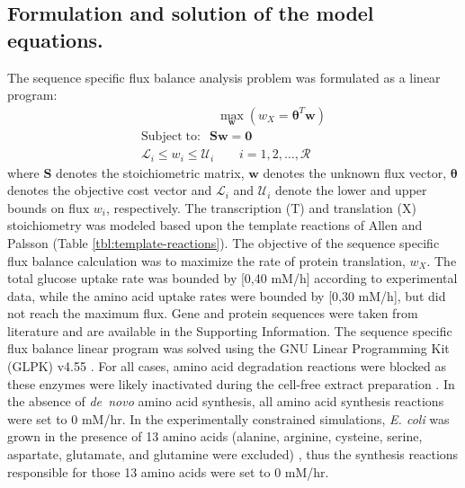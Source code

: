 \documentclass[journal=asbcd6,manuscript=article]{achemso}
\begin{document}
\subsection*{Formulation and solution of the model equations.}
The sequence specific flux balance analysis problem was formulated as a linear program:
\begin{equation}
 \begin{multlined}
	\qquad \qquad \qquad \max_{\boldsymbol{w}}{} \! \left( w_{X} = \mathbf{\boldsymbol{\theta}}^T \boldsymbol{w} \right) \\
	\mathrm{Subject \; to:}
	 \; \; \mathbf{S}\mathbf{w}=\mathbf{0} \\
\mathcal{L}_{i} \leq w_i \leq \mathcal{U}_{i}  \qquad i=1,2,\hdots,\mathcal{R}
 \end{multlined}
\end{equation}
where $\mathbf{S}$ denotes the stoichiometric matrix, $\mathbf{w}$ denotes the unknown flux vector, $\boldsymbol{\theta}$ denotes the objective cost vector
and $\mathcal{L}_{i}$ and $\mathcal{U}_{i}$ denote the lower and upper bounds on flux $w_{i}$, respectively.
The transcription (T) and translation (X) stoichiometry was modeled based upon the template reactions of Allen and Palsson \cite{Allen:2003aa} (Table \ref{tbl:template-reactions}).
The objective of the sequence specific flux balance calculation was to maximize the rate of protein translation, $w_{X}$.
The total glucose uptake rate was bounded by [0,40 mM/h] according to experimental data, while the amino acid uptake rates were bounded by [0,30 mM/h], but did not reach the maximum flux.
Gene and protein sequences were taken from literature and are available in the Supporting Information.
The sequence specific flux balance linear program was solved using the GNU Linear Programming Kit (GLPK) v4.55 \cite{GLPK}.
For all cases, amino acid degradation reactions were blocked as these enzymes were likely inactivated during the cell-free extract preparation \cite{2005_calhoun_BiotechnologyProgress, Garamella:2016aa}.
In the absence of \textit{de~novo} amino acid synthesis, all amino acid synthesis reactions were set to 0 mM/hr.
In the experimentally constrained simulations, \textit{E. coli} was grown in the presence of 13 amino acids (alanine, arginine, cysteine, serine, aspartate, glutamate, and glutamine were excluded) \cite{Zawada:2003}, thus the synthesis reactions responsible for those 13 amino acids were set to 0 mM/hr.
\end{document}

